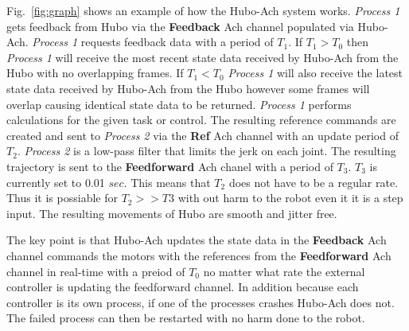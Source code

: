 Fig.~\ref{fig:graph} shows an example of how the Hubo-Ach system works.
\textit{Process 1} gets feedback from Hubo via the \textbf{Feedback} Ach channel populated via Hubo-Ach.  
\textit{Process 1} requests feedback data with a period of $T_1$.
If $T_1>T_0$ then \textit{Process 1} will receive the most recent state data received by Hubo-Ach from the Hubo with no overlapping frames.
If $T_1<T_0$ \textit{Process 1} will also receive the latest state data received by Hubo-Ach from the Hubo however some frames will overlap causing identical state data to be returned.
\textit{Process 1} performs calculations for the given task or control.
The resulting reference commands are created and sent to \textit{Process 2} via the \textbf{Ref} Ach channel with an update period of $T_2$.
\textit{Process 2} is a low-pass filter that limits the jerk on each joint.
The resulting trajectory is sent to the \textbf{Feedforward} Ach chanel with a period of $T_3$.
$T_3$ is currently set to 0.01 $sec$.
This means that $T_2$ does not have to be a regular rate.
Thus it is possiable for $T_2>>T3$ with out harm to the robot even it it is a step input.
The resulting movements of Hubo are smooth and jitter free.

The key point is that Hubo-Ach updates the state data in the \textbf{Feedback} Ach channel commands the motors with the references from the \textbf{Feedforward} Ach channel in real-time with a preiod of $T_0$ no matter what rate the external controller is updating the feedforward channel.  
In addition because each controller is its own process, if one of the processes crashes Hubo-Ach does not.
The failed process can then be restarted with no harm done to the robot.









